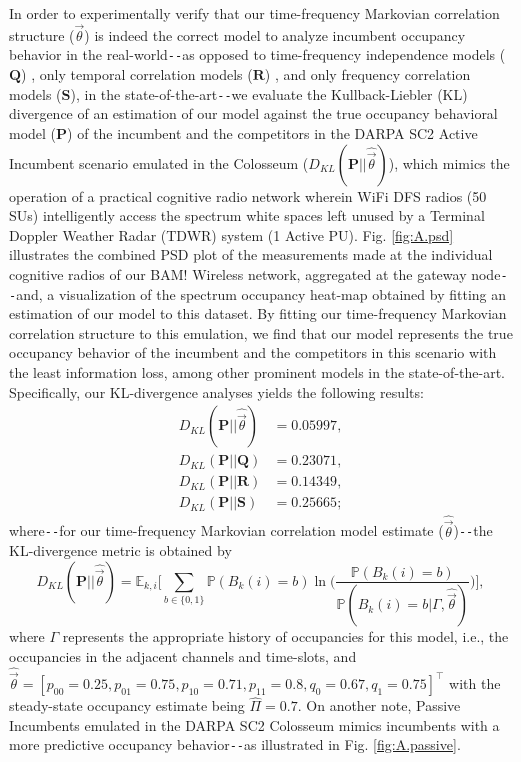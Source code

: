 \documentclass[12pt, draftcls, onecolumn]{IEEEtran}
\begin{document}
In order to experimentally verify that our time-frequency Markovian correlation structure ($\vec{\theta}$) is indeed the correct model to analyze incumbent occupancy behavior in the real-world\texttt{-{}-}as opposed to time-frequency independence models ($\mathbf{Q}$) \cite{WCL:4, WCL:10, WCL:9, WCL:11, WCL:8}, only temporal correlation models ($\mathbf{R}$) \cite{WCL:5}, and only frequency correlation models ($\mathbf{S}$), in the state-of-the-art\texttt{-{}-}we evaluate the Kullback-Liebler (KL) divergence of an estimation of our model against the true occupancy behavioral model ($\mathbf{P}$) of the incumbent and the competitors in the DARPA SC2 Active Incumbent scenario emulated in the Colosseum ($D_{KL}(\mathbf{P}{||}\hat{\vec{\theta}})$), which mimics the operation of a practical cognitive radio network wherein WiFi DFS radios (50 SUs) intelligently access the spectrum white spaces left unused by a Terminal Doppler Weather Radar (TDWR) system (1 Active PU). Fig. \ref{fig:A.psd} illustrates the combined PSD plot of the measurements made at the individual cognitive radios of our BAM! Wireless network, aggregated at the gateway node\texttt{-{}-}and, a visualization of the spectrum occupancy heat-map obtained by fitting an estimation of our model to this dataset. By fitting our time-frequency Markovian correlation structure to this emulation, we find that our model represents the true occupancy behavior of the incumbent and the competitors in this scenario with the least information loss, among other prominent models in the state-of-the-art. Specifically, our KL-divergence analyses yields the following results:
\begin{equation}
    \begin{aligned}
        D_{KL}(\mathbf{P}{||}\hat{\vec{\theta}}) &= 0.05997,\\
        D_{KL}(\mathbf{P}{||}\mathbf{Q}) &= 0.23071,\\
        D_{KL}(\mathbf{P}{||}\mathbf{R}) &= 0.14349,\\
        D_{KL}(\mathbf{P}{||}\mathbf{S}) &= 0.25665;
    \end{aligned}
\end{equation}
where\texttt{-{}-}for our time-frequency Markovian correlation model estimate ($\hat{\vec{\theta}}$)\texttt{-{}-}the KL-divergence metric is obtained by
\begin{equation}
    D_{KL}(\mathbf{P}{||}\hat{\vec{\theta}}) = \mathbb{E}_{k,i}\Bigg[\sum_{b{\in}\{0,1\}}\mathbb{P}(B_{k}(i){=}b)\ln\Bigg(\frac{\mathbb{P}(B_{k}(i){=}b)}{\mathbb{P}(B_{k}(i){=}b|\Gamma, \hat{\vec{\theta}})}\Bigg)\Bigg],
\end{equation}
where $\Gamma$ represents the appropriate history of occupancies for this model, i.e., the occupancies in the adjacent channels and time-slots, and $\hat{\vec{\theta}}{=}[p_{00}{=}0.25,p_{01}{=}0.75,p_{10}{=}0.71,p_{11}{=}0.8, q_{0}{=}0.67, q_{1}{=}0.75]^{\intercal}$ with the steady-state occupancy estimate being $\hat{\Pi}{=}0.7$. On another note, Passive Incumbents emulated in the DARPA SC2 Colosseum mimics incumbents with a more predictive occupancy behavior\texttt{-{}-}as illustrated in Fig. \ref{fig:A.passive}.
\end{document}
